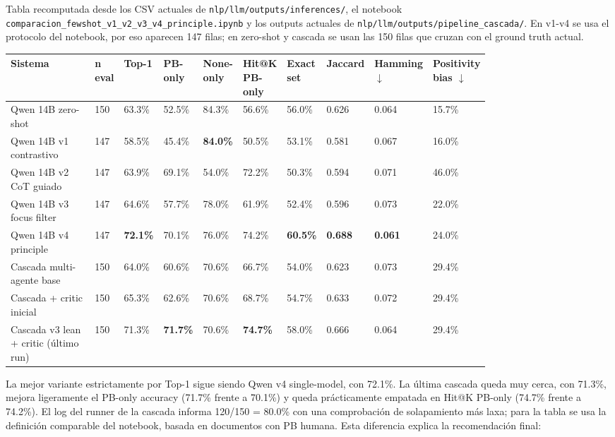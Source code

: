 Tabla recomputada desde los CSV actuales de \texttt{nlp/llm/outputs/inferences/}, el notebook \texttt{comparacion\_fewshot\_v1\_v2\_v3\_v4\_principle.ipynb} y los outputs actuales de \texttt{nlp/llm/outputs/pipeline\_cascada/}. En v1-v4 se usa el protocolo del notebook, por eso aparecen 147 filas; en zero-shot y cascada se usan las 150 filas que cruzan con el ground truth actual.

\begin{center}
\scriptsize
\setlength{\tabcolsep}{3pt}
\renewcommand{\arraystretch}{1.15}
\begin{tabular}{p{0.22\linewidth}p{0.05\linewidth}p{0.065\linewidth}p{0.065\linewidth}p{0.065\linewidth}p{0.065\linewidth}p{0.065\linewidth}p{0.065\linewidth}p{0.065\linewidth}p{0.065\linewidth}}
\toprule
Sistema & n eval & Top-1 & PB-only & None-only & Hit@K PB-only & Exact set & Jaccard & Hamming $\downarrow$ & Positivity bias $\downarrow$ \\
\midrule
Qwen 14B zero-shot & 150 & 63.3\% & 52.5\% & 84.3\% & 56.6\% & 56.0\% & 0.626 & 0.064 & 15.7\% \\
Qwen 14B v1 contrastivo & 147 & 58.5\% & 45.4\% & \textbf{84.0\%} & 50.5\% & 53.1\% & 0.581 & 0.067 & 16.0\% \\
Qwen 14B v2 CoT guiado & 147 & 63.9\% & 69.1\% & 54.0\% & 72.2\% & 50.3\% & 0.594 & 0.071 & 46.0\% \\
Qwen 14B v3 focus filter & 147 & 64.6\% & 57.7\% & 78.0\% & 61.9\% & 52.4\% & 0.596 & 0.073 & 22.0\% \\
Qwen 14B v4 principle & 147 & \textbf{72.1\%} & 70.1\% & 76.0\% & 74.2\% & \textbf{60.5\%} & \textbf{0.688} & \textbf{0.061} & 24.0\% \\
Cascada multi-agente base & 150 & 64.0\% & 60.6\% & 70.6\% & 66.7\% & 54.0\% & 0.623 & 0.073 & 29.4\% \\
Cascada + critic inicial & 150 & 65.3\% & 62.6\% & 70.6\% & 68.7\% & 54.7\% & 0.633 & 0.072 & 29.4\% \\
Cascada v3 lean + critic (último run) & 150 & 71.3\% & \textbf{71.7\%} & 70.6\% & \textbf{74.7\%} & 58.0\% & 0.666 & 0.064 & 29.4\% \\
\bottomrule
\end{tabular}
\end{center}

La mejor variante estrictamente por Top-1 sigue siendo Qwen v4 single-model, con 72.1\%. La última cascada queda muy cerca, con 71.3\%, mejora ligeramente el PB-only accuracy (71.7\% frente a 70.1\%) y queda prácticamente empatada en Hit@K PB-only (74.7\% frente a 74.2\%). El log del runner de la cascada informa 120/150 = 80.0\% con una comprobación de solapamiento más laxa; para la tabla se usa la definición comparable del notebook, basada en documentos con PB humana. Esta diferencia explica la recomendación final:

